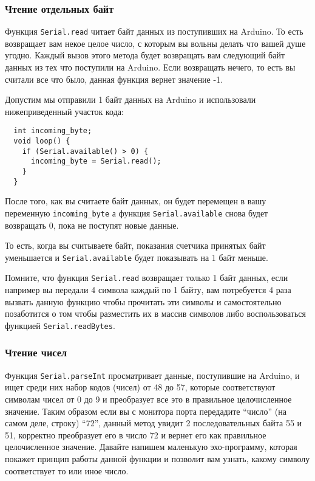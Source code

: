 \documentclass[../sparc.tex]{subfiles}
\begin{document}
\subsubsection{Чтение отдельных байт}

Функция \texttt{Serial.read} читает байт данных из поступивших на Arduino.  То
есть возвращает вам некое целое число, с которым вы вольны делать что вашей душе
угодно. Каждый вызов этого метода будет возвращать вам следующий байт данных из
тех что поступили на Arduino.  Если возвращать нечего, то есть вы считали все что
было, данная функция вернет значение -1.


Допустим мы отправили 1 байт данных на Arduino и использовали нижеприведенный
участок кода:

\begin{verbatim}
  int incoming_byte;
  void loop() {
    if (Serial.available() > 0) {
      incoming_byte = Serial.read();
    }
  }
\end{verbatim}

После того, как вы считаете байт данных, он будет перемещен в вашу переменную
\texttt{incoming\_byte} а функция \texttt{Serial.available} снова будет
возвращать 0, пока не поступят новые данные.

То есть, когда вы считываете байт, показания счетчика принятых байт уменьшается
и \texttt{Serial.available} будет показывать на 1 байт меньше.

Помните, что функция \texttt{Serial.read} возвращает только 1 байт данных, если
например вы передали 4 символа каждый по 1 байту, вам потребуется 4 раза вызвать
данную функцию чтобы прочитать эти символы и самостоятельно позаботится о том
чтобы разместить их в массив символов либо воспользоваться функцией
\texttt{Serial.readBytes}.

\subsubsection{Чтение чисел}

Функция \texttt{Serial.parseInt} просматривает данные, поступившие на Arduino, и
ищет среди них набор кодов (чисел) от 48 до 57, которые соответствуют символам
чисел от 0 до 9 и преобразует все это в правильное целочисленное значение. Таким
образом если вы с монитора порта передадите ``число'' (на самом деле, строку)
``72'', данный метод увидит 2 последовательных байта 55 и 51, корректно
преобразует его в число 72 и вернет его как правильное целочисленное значение.
Давайте напишем маленькую эхо-программу, которая покажет принцип работы данной
функции и позволит вам узнать, какому символу соответствует то или иное число.
\end{document}
